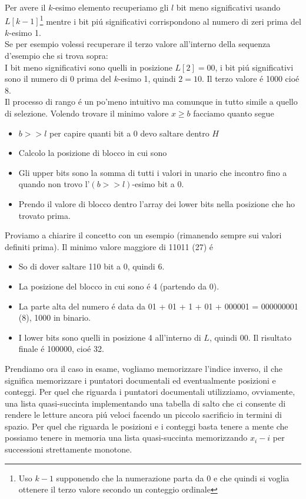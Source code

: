 Per avere il $k$-esimo elemento recuperiamo gli $l$ bit meno significativi usando $L[k - 1]$\footnote{Uso $k - 1$ supponendo che la numerazione parta da 0 e che quindi si voglia ottenere il terzo valore secondo un conteggio ordinale} mentre i bit piú significativi corrispondono al numero di zeri prima del $k$-esimo 1.\\
Se per esempio volessi recuperare il terzo valore all'interno della sequenza d'esempio che si trova sopra:\\
I bit meno significativi sono quelli in posizione $L[2] = 00$, i bit piú significativi sono il numero di 0 prima del $k$-esimo 1, quindi $2 = 10$. Il terzo valore é 1000 cioé $8$.\\
Il processo di rango é un po'meno intuitivo ma comunque in tutto simile a quello di selezione. Volendo trovare il minimo valore $x \geq b$ facciamo quanto segue
\begin{itemize}
    \item $b >> l$ per capire quanti bit a 0 devo saltare dentro $H$
    \item Calcolo la posizione di blocco in cui sono
    \item Gli upper bits sono la somma di tutti i valori in unario che incontro fino a quando non trovo l'$(b >> l)$-esimo bit a 0.
    \item Prendo il valore di blocco dentro l'array dei lower bits nella posizione che ho trovato prima.
\end{itemize}
Proviamo a chiarire il concetto con un esempio (rimanendo sempre sui valori definiti prima). Il minimo valore maggiore di 11011 (27) é
\begin{itemize}
    \item So di dover saltare 110 bit a 0, quindi 6.
    \item La posizione del blocco in cui sono é 4 (partendo da 0).
    \item La parte alta del numero é data da 01 + 01 + 1 + 01 + 000001 = 000000001 (8), 1000 in binario.
    \item I lower bits sono quelli in posizione 4 all'interno di $L$, quindi 00. Il risultato finale é 100000, cioé 32.
\end{itemize}
Prendiamo ora il caso in esame, vogliamo memorizzare l'indice inverso, il che significa memorizzare i puntatori documentali ed eventualmente posizioni e conteggi. Per quel che riguarda i puntatori documentali utilizziamo, ovviamente, una lista quasi-succinta implementando una tabella di salto che ci consente di rendere le letture ancora piú veloci facendo un piccolo sacrificio in termini di spazio. Per quel che riguarda le posizioni e i conteggi basta tenere a mente che possiamo tenere in memoria una lista quasi-succinta memorizzando $x_i - i$  per successioni strettamente monotone.\\

